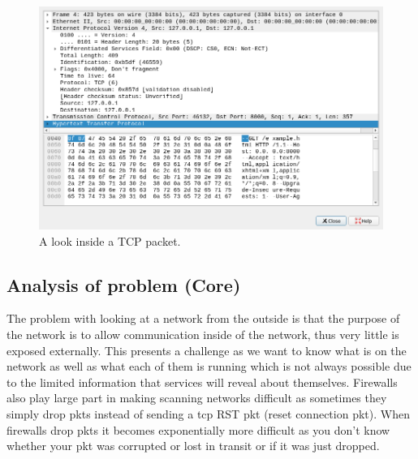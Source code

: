 \documentclass[titlepage]{article}
\let\Oldsubsection\subsection{}
\renewcommand{\subsection}{\FloatBarrier\Oldsubsection}
\begin{document}
\begin{figure}[H]
  \centering
  \includegraphics[width=\textwidth]{screenshots/deconstructed_packet.png}
  \caption{%
    A look inside a TCP packet.
  }\label{deconstructed}
\end{figure}

\lstset{language=HTML}


\subsection{Analysis of problem (Core)}

The problem with looking at a network from the outside is that the purpose of the network is to
allow communication inside of the network, thus very little is exposed externally. This presents
a challenge as we want to know what is on the network as well as what each of them is running which
is not always possible due to the limited information that services will reveal about themselves.
Firewalls also play large part in making scanning networks difficult as sometimes they simply drop
\glspl{pkt} instead of sending a \gls{tcp} RST \gls{pkt} (reset connection \gls{pkt}).
When firewalls drop \glspl{pkt} it becomes exponentially more difficult as you don't know whether
your \gls{pkt} was corrupted or lost in transit or if it was just dropped.
\end{document}
